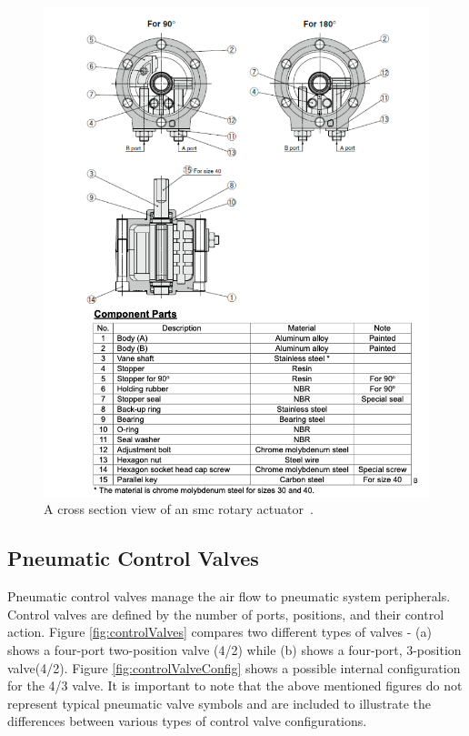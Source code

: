     \begin{figure}[H] %
        \centering
        \includegraphics[scale = 0.4]{2_images/rotaryActuator.png}
        \caption{A cross section view of an \acrshort{smc} rotary actuator~\cite{smcRot}.}
        \label{fig:rotaryActuator}
    \end{figure}
\newpage
\subsection{Pneumatic Control Valves}
    Pneumatic control valves manage the air flow to pneumatic system peripherals. Control valves are defined by the number of ports, positions, and their control action\cite{parr2011hydraulics}. Figure \ref{fig:controlValves} compares two different types of valves - (a) shows a four-port two-position valve (4/2) while (b) shows a four-port, 3-position valve(4/2). Figure \ref{fig:controlValveConfig} shows a possible internal configuration for the 4/3 valve. It is important to note that the above mentioned figures do not represent typical pneumatic valve symbols and are included to illustrate the differences between various types of control valve configurations.
    
